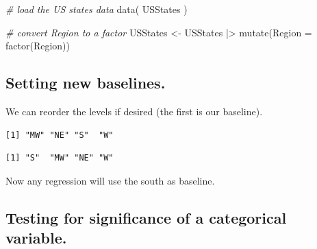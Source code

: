 \documentclass[
  letterpaper,
  DIV=11,
  numbers=noendperiod]{scrreprt}
\newenvironment{Shaded}{\begin{snugshade}}{\end{snugshade}}
\newcommand{\AttributeTok}[1]{\textcolor[rgb]{0.49,0.56,0.16}{#1}}
\newcommand{\CommentTok}[1]{\textcolor[rgb]{0.38,0.63,0.69}{\textit{#1}}}
\newcommand{\FunctionTok}[1]{\textcolor[rgb]{0.02,0.16,0.49}{#1}}
\newcommand{\NormalTok}[1]{\textcolor[rgb]{0.00,0.44,0.13}{#1}}
\newcommand{\OtherTok}[1]{\textcolor[rgb]{0.00,0.44,0.13}{#1}}
\newcommand{\SpecialCharTok}[1]{\textcolor[rgb]{0.25,0.44,0.63}{#1}}
\newcommand{\StringTok}[1]{\textcolor[rgb]{0.25,0.44,0.63}{#1}}
\begin{document}
\begin{Shaded}
\begin{Highlighting}[]
\CommentTok{\# load the US states data}
\FunctionTok{data}\NormalTok{( USStates )}

\CommentTok{\# convert Region to a factor}
\NormalTok{USStates }\OtherTok{\textless{}{-}}\NormalTok{ USStates }\SpecialCharTok{|\textgreater{}} 
  \FunctionTok{mutate}\NormalTok{(}\AttributeTok{Region =} \FunctionTok{factor}\NormalTok{(Region))}
\end{Highlighting}
\end{Shaded}

\hypertarget{setting-new-baselines.}{%
\subsection{Setting new baselines.}\label{setting-new-baselines.}}

We can reorder the levels if desired (the first is our baseline).

\begin{Shaded}
\end{Shaded}

\begin{verbatim}
[1] "MW" "NE" "S"  "W" 
\end{verbatim}

\begin{Shaded}
\end{Shaded}

\begin{verbatim}
[1] "S"  "MW" "NE" "W" 
\end{verbatim}

Now any regression will use the south as baseline.

\hypertarget{testing-for-significance-of-a-categorical-variable.}{%
\subsection{Testing for significance of a categorical
variable.}\label{testing-for-significance-of-a-categorical-variable.}}
\end{document}
